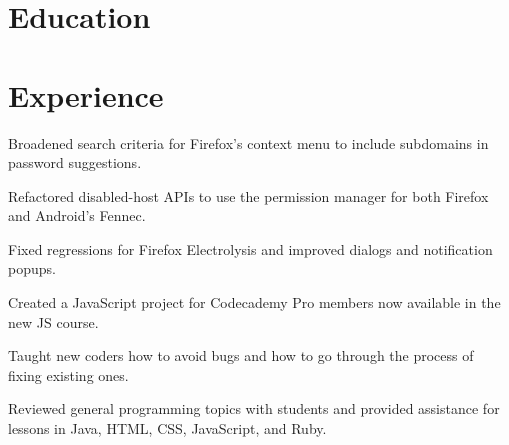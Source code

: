 \documentclass[]{deedy-resume-openfont}
\begin{document}
%
%


%
%
\section{Education}

  \hfill {}
\sectionsep

%
%
\section{Experience}

  \hfill {}
\begin{tightemize}
\item Broadened search criteria for Firefox’s context menu to include subdomains in password suggestions.
\item Refactored disabled-host APIs to use the permission manager for both Firefox and Android’s Fennec.
\item Fixed regressions for Firefox Electrolysis and improved dialogs and notification popups.
\end{tightemize}
\sectionsep

  \hfill {}
\begin{tightemize}
\item Created a JavaScript project for Codecademy Pro members now available in the new JS course.
\item Taught new coders how to avoid bugs and how to go through the process of fixing existing ones.
\item Reviewed general programming topics with students and provided assistance for lessons in Java, HTML, CSS, JavaScript, and Ruby.
\end{tightemize}
\sectionsep
\end{document}
